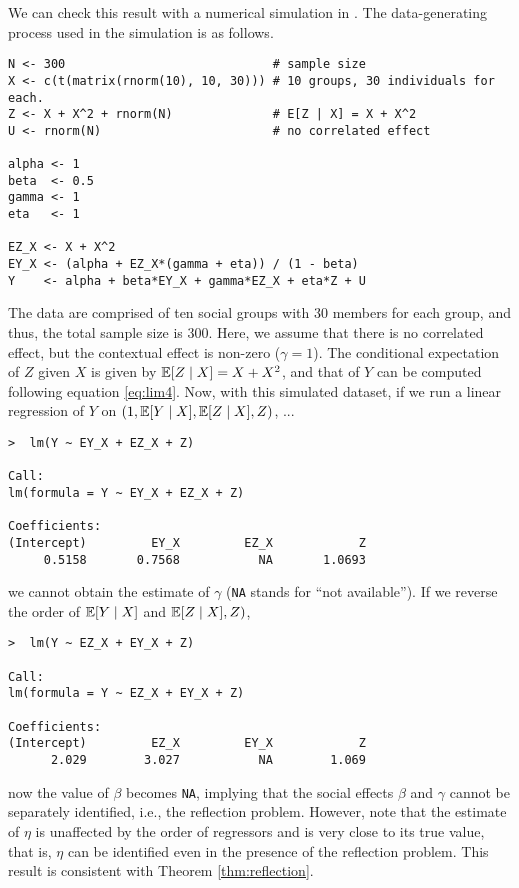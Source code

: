 \documentclass[11pt, A4paper, openany, uplatex]{book}
\begin{document}
We can check this result with a numerical simulation in \R.
The data-generating process used in the simulation is as follows.
\begin{lstlisting}[basicstyle=\ttfamily\footnotesize, frame=single]
N <- 300                             # sample size
X <- c(t(matrix(rnorm(10), 10, 30))) # 10 groups, 30 individuals for each.
Z <- X + X^2 + rnorm(N)              # E[Z | X] = X + X^2
U <- rnorm(N)                        # no correlated effect
 
alpha <- 1
beta  <- 0.5
gamma <- 1
eta   <- 1
 
EZ_X <- X + X^2
EY_X <- (alpha + EZ_X*(gamma + eta)) / (1 - beta)
Y    <- alpha + beta*EY_X + gamma*EZ_X + eta*Z + U
 \end{lstlisting}
The data are comprised of ten social groups with 30 members for each group, and thus, the total sample size is 300.
Here, we assume that there is no correlated effect, but the contextual effect is non-zero ($\gamma = 1$).
The conditional expectation of $Z$ given $X$ is given by $\mathbb{E}[Z \mid X] = X + X^2$, and that of $Y$ can be computed following equation \eqref{eq:lim4}.
Now, with this simulated dataset, if we run a linear regression of $Y$ on $(1, \mathbb{E}[Y \mid X], \mathbb{E}[Z \mid X], Z)$, ...
\begin{lstlisting}[basicstyle=\ttfamily\footnotesize, frame=single]
>  lm(Y ~ EY_X + EZ_X + Z)

Call:
lm(formula = Y ~ EY_X + EZ_X + Z)

Coefficients:
(Intercept)         EY_X         EZ_X            Z  
	 0.5158       0.7568           NA       1.0693 
\end{lstlisting}
we cannot obtain the estimate of $\gamma$ (\texttt{NA} stands for ``not available'').
If we reverse the order of $\mathbb{E}[Y \mid X]$ and $\mathbb{E}[Z \mid X], Z)$,
\begin{lstlisting}[basicstyle=\ttfamily\footnotesize, frame=single]
>  lm(Y ~ EZ_X + EY_X + Z)

Call:
lm(formula = Y ~ EZ_X + EY_X + Z)
	
Coefficients:
(Intercept)         EZ_X         EY_X            Z  
	  2.029        3.027           NA        1.069
\end{lstlisting}
now the value of $\beta$ becomes \texttt{NA}, implying that the social effects $\beta$ and $\gamma$ cannot be separately identified, i.e., the reflection problem.
However, note that the estimate of $\eta$ is unaffected by the order of regressors and is very close to its true value, that is, $\eta$ can be identified even  in the presence of the reflection problem.
This result is consistent with Theorem \ref{thm:reflection}.
\end{document}
